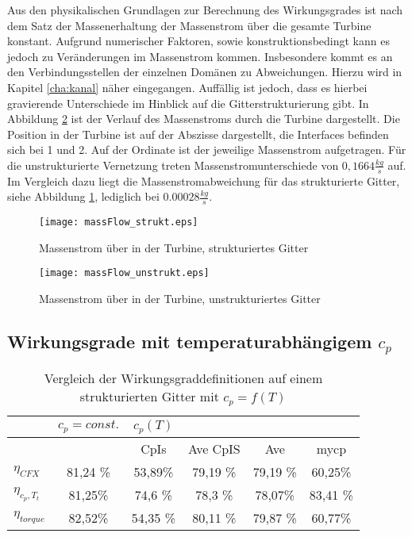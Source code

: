 Aus den physikalischen Grundlagen zur Berechnung des Wirkungsgrades ist nach dem Satz der Massenerhaltung der Massenstrom über die gesamte Turbine konstant.
Aufgrund numerischer Faktoren, sowie konstruktionsbedingt kann es jedoch zu Veränderungen im Massenstrom kommen. 
Insbesondere kommt es an den Verbindungsstellen der einzelnen Domänen zu Abweichungen. Hierzu wird in Kapitel \ref{cha:kanal} näher eingegangen.
Auffällig ist jedoch, dass es hierbei gravierende Unterschiede im Hinblick auf die Gitterstrukturierung gibt. In Abbildung \ref{fig:massFlowUnstrukt} ist der Verlauf des Massenstroms durch die Turbine dargestellt. Die Position in der Turbine ist auf der Abszisse dargestellt, die Interfaces befinden sich bei 1 und 2. Auf der Ordinate ist der jeweilige Massenstrom aufgetragen. Für die unstrukturierte Vernetzung treten Massenstromunterschiede von $0,1664 \frac{kg}{s}$ auf. Im Vergleich dazu liegt die Massenstromabweichung für das strukturierte Gitter, siehe Abbildung \ref{fig:massFlowStrukt}, lediglich bei $0.00028\frac{kg}{s}$.

 \begin{figure}[htbp]
	\centering
	\texttt{[image: massFlow\_strukt.eps]}
	\caption{Massenstrom über in der Turbine, strukturiertes Gitter} \label{fig:massFlowStrukt}
\end{figure} 
 \begin{figure}[htbp]
	\centering
	\texttt{[image: massFlow\_unstrukt.eps]}
	\caption{Massenstrom über in der Turbine, unstrukturiertes Gitter} \label{fig:massFlowUnstrukt}
\end{figure} 
\subsection{Wirkungsgrade mit temperaturabhängigem $c_p$}
\begin{table}[H]
	\centering
	\caption{Vergleich der Wirkungsgraddefinitionen auf einem strukturierten Gitter mit $c_p = f(T)$}
	\begin{tabular}{ l| c | c c c c}
		&	$c_p = const.$	&	$c_p(T)$	&		&		&		\\
		\hline
		&		&	CpIs	&	Ave CpIS	&	Ave	&	mycp	\\
		\hline
		$\eta_{CFX}$	&	81,24 \%	&	53,89\%	&	79,19 \%	&	79,19 \%	&	60,25\%	\\
		$\eta_{c_p, T_t}$	&	81,25\%	&	74,6 \%	&	78,3 \%	&	78,07\%	&	83,41 \%	\\
	$\eta_{torque}$	&	82,52\%	&	54,35 \%	&	80,11 \%	&	79,87 \%	&	60,77\%	\\
		
	\end{tabular}
	\label{tab:strukturiertmycp}
\end{table}

